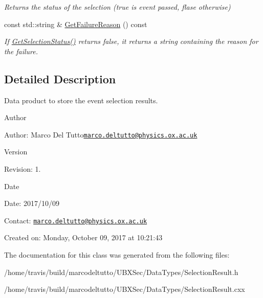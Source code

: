 \begin{DoxyCompactItemize}
\begin{DoxyCompactList}\small\item\em Returns the status of the selection (true is event passed, flase otherwise) \end{DoxyCompactList}\item 
\hypertarget{classubana_1_1SelectionResult_abfd85000aca03d3cd347cde67f7b7e4b}{const std\-::string \& \hyperlink{classubana_1_1SelectionResult_abfd85000aca03d3cd347cde67f7b7e4b}{Get\-Failure\-Reason} () const }\label{classubana_1_1SelectionResult_abfd85000aca03d3cd347cde67f7b7e4b}

\begin{DoxyCompactList}\small\item\em If \hyperlink{classubana_1_1SelectionResult_a776daea1e79f4b6978f0d4fd17a0a845}{Get\-Selection\-Status()} returns false, it returns a string containing the reason for the failure. \end{DoxyCompactList}\end{DoxyCompactItemize}


\subsection{Detailed Description}
Data product to store the event selection results. 

\begin{DoxyAuthor}{Author}

\end{DoxyAuthor}
\begin{DoxyParagraph}{Author\-:}
Marco Del Tutto\href{mailto:marco.deltutto@physics.ox.ac.uk}{\tt marco.\-deltutto@physics.\-ox.\-ac.\-uk} 
\end{DoxyParagraph}


\begin{DoxyVersion}{Version}

\end{DoxyVersion}
\begin{DoxyParagraph}{Revision\-:}
1. 
\end{DoxyParagraph}


\begin{DoxyDate}{Date}

\end{DoxyDate}
\begin{DoxyParagraph}{Date\-:}
2017/10/09 
\end{DoxyParagraph}


Contact\-: \href{mailto:marco.deltutto@physics.ox.ac.uk}{\tt marco.\-deltutto@physics.\-ox.\-ac.\-uk}

Created on\-: Monday, October 09, 2017 at 10\-:21\-:43 

The documentation for this class was generated from the following files\-:\begin{DoxyCompactItemize}
\item 
/home/travis/build/marcodeltutto/\-U\-B\-X\-Sec/\-Data\-Types/Selection\-Result.\-h\item 
/home/travis/build/marcodeltutto/\-U\-B\-X\-Sec/\-Data\-Types/Selection\-Result.\-cxx\end{DoxyCompactItemize}
